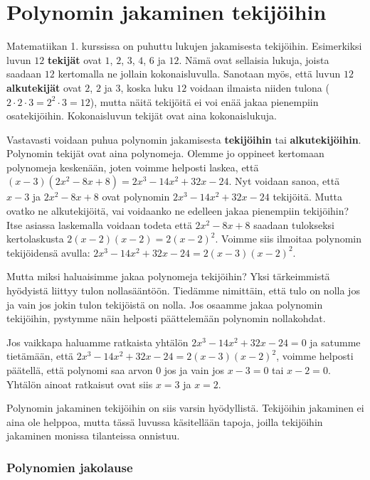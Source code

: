 \chapter{Polynomin jakaminen tekijöihin}

Matematiikan 1. kurssissa on puhuttu lukujen jakamisesta tekijöihin.
Esimerkiksi luvun $12$ {\bf tekijät} ovat $1$, $2$, $3$, $4$, $6$ ja $12$. Nämä ovat sellaisia
lukuja, joista saadaan $12$ kertomalla ne jollain kokonaisluvulla. Sanotaan myös, että luvun $12$
{\bf alkutekijät} ovat $2$, $2$ ja $3$, koska luku $12$ voidaan
ilmaista niiden tulona ($2\cdot 2\cdot 3 = 2^2\cdot 3 = 12$), mutta näitä tekijöitä ei
voi enää jakaa pienempiin osatekijöihin. Kokonaisluvun tekijät ovat aina kokonaislukuja.

Vastavasti voidaan puhua polynomin jakamisesta {\bf tekijöihin} tai {\bf alkutekijöihin}. Polynomin tekijät
ovat aina polynomeja. Olemme jo oppineet kertomaan polynomeja keskenään,
joten voimme helposti laskea, että $(x-3)(2x^2-8x+8)=2x^3-14x^2+32x-24$.
Nyt voidaan sanoa, että $x-3$ ja $2x^2-8x+8$ ovat polynomin $2x^3-14x^2+32x-24$ tekijöitä.
Mutta ovatko ne alkutekijöitä, vai voidaanko ne edelleen jakaa pienempiin tekijöihin?
Itse asiassa laskemalla voidaan todeta että $2x^2-8x+8$ saadaan tulokseksi kertolaskusta $2(x-2)(x-2)=2(x-2)^2$.
Voimme siis ilmoitaa polynomin tekijöidensä avulla: $2x^3-14x^2+32x-24=2(x-3)(x-2)^2$.

Mutta miksi haluaisimme jakaa polynomeja tekijöihin?
Yksi tärkeimmistä hyödyistä liittyy tulon nollasääntöön. Tiedämme nimittäin, että tulo on nolla jos ja vain jos
jokin tulon tekijöistä on nolla. Jos osaamme jakaa polynomin tekijöihin, pystymme näin helposti päättelemään polynomin nollakohdat.

Jos vaikkapa haluamme ratkaista yhtälön $2x^3-14x^2+32x-24=0$ ja satumme tietämään, että $2x^3-14x^2+32x-24=2(x-3)(x-2)^2$,
voimme helposti päätellä, että polynomi saa arvon $0$ jos ja vain jos $x-3=0$ tai $x-2=0$. Yhtälön ainoat ratkaisut ovat siis $x=3$ ja $x=2$.


Polynomin jakaminen tekijöihin on siis varsin hyödyllistä. Tekijöihin jakaminen ei aina ole helppoa,
mutta tässä luvussa käsitellään tapoja, joilla tekijöihin jakaminen monissa tilanteissa onnistuu.

\subsection*{Polynomien jakolause}

